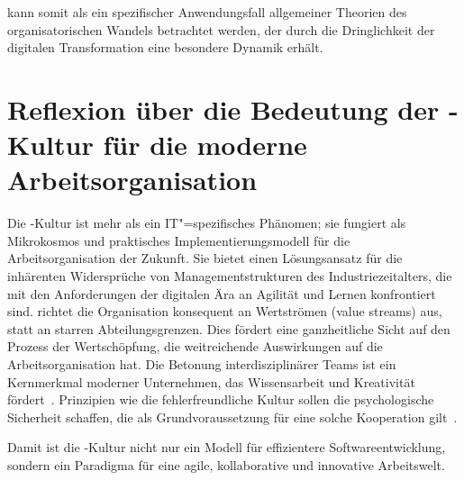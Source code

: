 \DO kann somit als ein spezifischer Anwendungsfall allgemeiner Theorien des organisatorischen Wandels betrachtet werden, der durch die Dringlichkeit der digitalen Transformation eine besondere Dynamik erhält.

\section{Reflexion über die Bedeutung der \DO-Kultur für die moderne Arbeitsorganisation}

Die \DO-Kultur ist mehr als ein IT"=spezifisches Phänomen; sie fungiert als Mikrokosmos und praktisches Implementierungsmodell für die Arbeitsorganisation der Zukunft.
Sie bietet einen Lösungsansatz für die inhärenten Widersprüche von Managementstrukturen des Industriezeitalters, die mit den Anforderungen der digitalen Ära an Agilität und Lernen konfrontiert sind.
\DO richtet die Organisation konsequent an Wertströmen (\foreignlanguage{american}{value streams}) aus, statt an starren Abteilungsgrenzen.
Dies fördert eine ganzheitliche Sicht auf den Prozess der Wertschöpfung, die weitreichende Auswirkungen auf die Arbeitsorganisation hat.
Die Betonung interdisziplinärer Teams ist ein Kernmerkmal moderner Unternehmen, das Wissensarbeit und Kreativität fördert~\cite[313]{nay24}.
Prinzipien wie die fehlerfreundliche Kultur sollen die psychologische Sicherheit schaffen, die als Grundvoraussetzung für eine solche Kooperation gilt~\cite[528]{win23}.

Damit ist die \DO-Kultur nicht nur ein Modell für effizientere Softwareentwicklung, sondern ein Paradigma für eine agile, kollaborative und innovative Arbeitswelt.